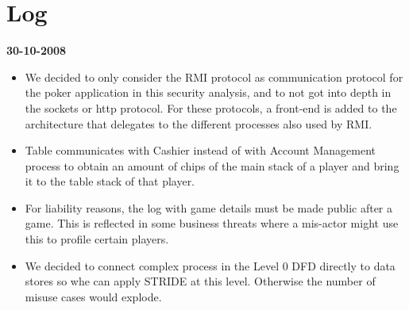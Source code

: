 \documentclass[a4paper,11pt]{report}
\begin{document}
\section{Log}
\textbf{30-10-2008}
\begin{itemize}
\item We decided to only consider the RMI protocol as communication protocol for the poker application in this 
security analysis, and to not got into depth in the sockets or http protocol. For these protocols, a front-end is added to the architecture that delegates to the different processes also used by RMI.
\item Table communicates with Cashier instead of with Account Management process to obtain an amount of chips
of the main stack of a player and bring it to the table stack of that player.
\item For liability reasons, the log with game details must be made public after a game. This is reflected in some
business threats where a mis-actor might use this to profile certain players.
\item We decided to connect complex process in the Level 0 DFD directly to data stores so whe can apply STRIDE
at this level. Otherwise the number of misuse cases would explode.
\end{itemize}

\nocite{1202957}
\nocite{citeulike:174301}
\nocite{yskout}


\end{document}
